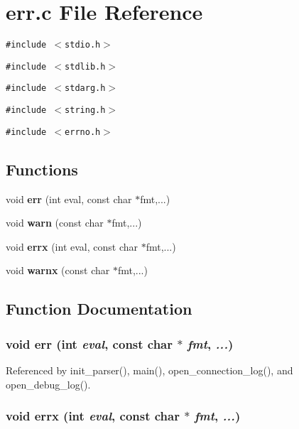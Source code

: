 \section{err.c File Reference}
\label{err_8c}
{\tt \#include $<$stdio.h$>$}\par
{\tt \#include $<$stdlib.h$>$}\par
{\tt \#include $<$stdarg.h$>$}\par
{\tt \#include $<$string.h$>$}\par
{\tt \#include $<$errno.h$>$}\par
\subsection*{Functions}
\begin{CompactItemize}
\item 
void {\bf err} (int eval, const char $\ast$fmt,...)
\item 
void {\bf warn} (const char $\ast$fmt,...)
\item 
void {\bf errx} (int eval, const char $\ast$fmt,...)
\item 
void {\bf warnx} (const char $\ast$fmt,...)
\end{CompactItemize}


\subsection{Function Documentation}
\subsubsection[{err}]{\setlength{\rightskip}{0pt plus 5cm}void err (int {\em eval}, \/  const char $\ast$ {\em fmt}, \/   {\em ...})}\label{err_8c_ac7e66a886f062322beba3cb396968aa}




Referenced by init\_\-parser(), main(), open\_\-connection\_\-log(), and open\_\-debug\_\-log().
\subsubsection[{errx}]{\setlength{\rightskip}{0pt plus 5cm}void errx (int {\em eval}, \/  const char $\ast$ {\em fmt}, \/   {\em ...})}\label{err_8c_eaca83913c785b95d6c50f35207ff739}




